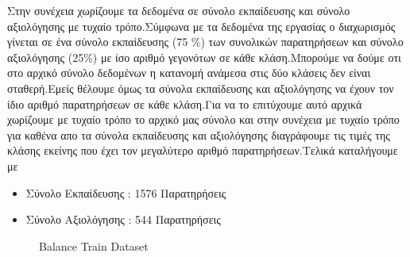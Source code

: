 \documentclass[12pt,a4paper]{article}
\begin{document}
\par Στην συνέχεια χωρίζουμε τα δεδομένα σε σύνολο εκπαίδευσης και σύνολο αξιολόγησης με τυχαίο τρόπο.Σύμφωνα με τα δεδομένα της εργασίας ο διαχωρισμός γίνεται σε ένα σύνολο εκπαίδευσης (75 \%) των συνολικών παρατηρήσεων και σύνολο αξιολόγησης (25\%) με ίσο αριθμό γεγονότων σε κάθε κλάση.Μπορούμε να δούμε οτι στο αρχικό σύνολο δεδομένων η κατανομή ανάμεσα στις δύο κλάσεις δεν είναι σταθερή.Εμείς θέλουμε όμως τα σύνολα εκπαίδευσης και αξιολόγησης να έχουν τον ίδιο αριθμό παρατηρήσεων σε κάθε κλάση.Για να το επιτύχουμε αυτό αρχικά χωρίζουμε με τυχαίο τρόπο το αρχικό μας σύνολο και στην συνέχεια με τυχαίο τρόπο για καθένα απο τα σύνολα εκπαίδευσης και αξιολόγησης διαγράφουμε τις τιμές της κλάσης εκείνης που έχει τον μεγαλύτερο αριθμό παρατηρήσεων.Τελικά καταλήγουμε με
\begin{itemize}
\item Σύνολο Εκπαίδευσης : 1576 Παρατηρήσεις
\item Σύνολο Αξιολόγησης : 544 Παρατηρήσεις
\end{itemize}
\begin{figure}[H]
    \centering
    \qquad
    \caption{Balance Train Dataset}%
    \label{fig:example}%
\end{figure}
\end{document}
